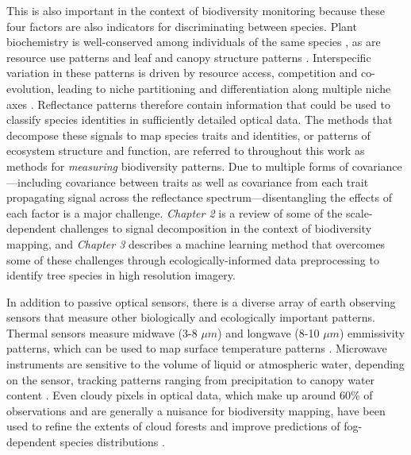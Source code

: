 This is also important in the context of biodiversity monitoring because these four factors are also indicators for discriminating between species. Plant biochemistry is well-conserved among individuals of the same species \cite{Kokaly2009-xk, Asner2011-tn, Funk2017-io}, as are resource use patterns and leaf and canopy structure patterns \cite{Halle1978-zu, Townsend2007-zm}. Interspecific variation in these patterns is driven by resource access, competition and co-evolution, leading to niche partitioning and differentiation along multiple niche axes \cite{Wright2004-md, Osnas2013-vp}. Reflectance patterns therefore contain information that could be used to classify species identities in sufficiently detailed optical data. The methods that decompose these signals to map species traits and identities, or patterns of ecosystem structure and function, are referred to throughout this work as methods for \textit{measuring} biodiversity patterns. Due to multiple forms of covariance—including covariance between traits as well as covariance from each trait propagating signal across the reflectance spectrum—disentangling the effects of each factor is a major challenge. \textit{Chapter 2} is a review of some of the scale-dependent challenges to signal decomposition in the context of biodiversity mapping, and \textit{Chapter 3} describes a machine learning method that overcomes some of these challenges through ecologically-informed data preprocessing to identify tree species in high resolution imagery.

In addition to passive optical sensors, there is a diverse array of earth observing sensors that measure other biologically and ecologically important patterns. Thermal sensors measure midwave (3-8 $\mu m$) and longwave (8-10 $\mu m$) emmissivity patterns, which can be used to map surface temperature patterns \cite{Li2013-uw}. Microwave instruments are sensitive to the volume of liquid or atmospheric water, depending on the sensor, tracking patterns ranging from precipitation to canopy water content \cite{Hou2013-cn, Konings2019-fd}. Even cloudy pixels in optical data, which make up around 60\% of observations and are generally a nuisance for biodiversity mapping, have been used to refine the extents of cloud forests and improve predictions of fog-dependent species distributions \cite{Wilson2016-pv}. 

